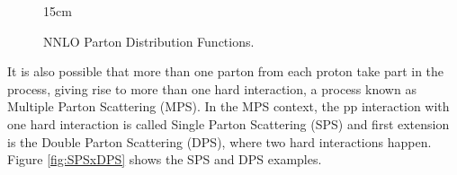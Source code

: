 \begin{figure}[!htm]{15cm} 
\caption{NNLO Parton Distribution Functions.}%
\label{fig:NNLOPDFs}
\end{figure}

It is also possible that more than one parton from each proton take part in the process, giving rise to more than one hard interaction, a process known as Multiple Parton Scattering (MPS). In the MPS context, the pp interaction with one hard interaction is called Single Parton Scattering (SPS) and first extension is the Double Parton Scattering (DPS), where two hard interactions happen. Figure \ref{fig:SPSxDPS} shows the SPS and DPS examples.

